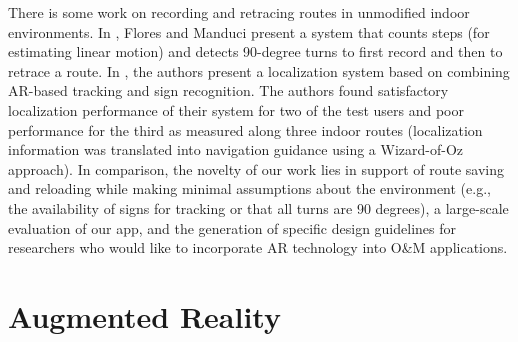 \documentclass[chi]{sigchi}
\newcommand{\BVI}{B/VI\xspace}
\newcommand{\OM}{O\&M\xspace}
\begin{document}
There is some work on recording and retracing routes in unmodified indoor environments.  In \cite{flores2018easy, flores2014ariadne}, Flores and Manduci present a system that counts steps (for estimating linear motion) and detects 90-degree turns to first record and then to retrace a route.  In \cite{fusco2018indoor}, the authors present a localization system based on combining AR-based tracking and sign recognition.  The authors found satisfactory localization performance of their system for two of the test users and poor performance for the third as measured along three indoor routes (localization information was translated into navigation guidance using a Wizard-of-Oz approach).  In comparison, the novelty of our work lies in support of route saving and reloading while making minimal assumptions about the environment (e.g., the availability of signs for tracking or that all turns are 90 degrees), a large-scale evaluation of our app, and the generation of specific design guidelines for researchers who would like to incorporate AR technology into \OM applications.


\section{Augmented Reality}
%
\end{document}
